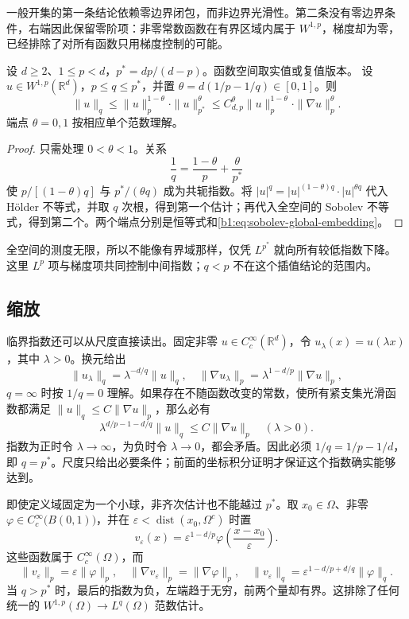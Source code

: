 一般开集的第一条结论依赖零边界闭包，而非边界光滑性。第二条没有零边界条件，右端因此保留零阶项：非零常数函数在有界区域内属于 \(W^{1,p}\)，梯度却为零，已经排除了对所有函数只用梯度控制的可能。

\begin{proposition}\label{b1:prop:sobolev-subcritical-interpolation}
设 \(d\geq2\)、\(1\leq p<d\)，\(p^*=dp/(d-p)\)。函数空间取实值或复值版本。
设 \(u\in W^{1,p}(\mathbb R^d)\)，\(p\leq q\leq p^*\)，并置
\(\theta=d(1/p-1/q)\in[0,1]\)。则
\begin{equation}\label{b1:eq:sobolev-subcritical-interpolation}
 \|u\|_q
 \leq \|u\|_p^{1-\theta}\cdot\|u\|_{p^*}^{\theta}
 \leq C_{d,p}^{\theta}
       \|u\|_p^{1-\theta}\cdot\|\nabla u\|_p^{\theta}.
\end{equation}
端点 \(\theta=0,1\) 按相应单个范数理解。
\end{proposition}
\begin{proof}
只需处理 \(0<\theta<1\)。关系
\[
 \frac1q=\frac{1-\theta}{p}+\frac{\theta}{p^*}
\]
使 \(p/[(1-\theta)q]\) 与 \(p^*/(\theta q)\) 成为共轭指数。将
\(|u|^q=|u|^{(1-\theta)q}\cdot|u|^{\theta q}\) 代入 Hölder 不等式，并取 \(q\) 次根，得到第一个估计；再代入全空间的 Sobolev 不等式，得到第二个。两个端点分别是恒等式和\eqref{b1:eq:sobolev-global-embedding}。
\end{proof}

全空间的测度无限，所以不能像有界域那样，仅凭 \(L^{p^*}\) 就向所有较低指数下降。这里 \(L^p\) 项与梯度项共同控制中间指数；\(q<p\) 不在这个插值结论的范围内。

\subsection{缩放}
\label{b1:subsec:240204}

临界指数还可以从尺度直接读出。固定非零
\(u\in C_c^\infty(\mathbb R^d)\)，令 \(u_\lambda(x)=u(\lambda x)\)，其中 \(\lambda>0\)。换元给出
\[
 \|u_\lambda\|_q=\lambda^{-d/q}\|u\|_q,\quad
 \|\nabla u_\lambda\|_p=\lambda^{1-d/p}\|\nabla u\|_p,
\]
\(q=\infty\) 时按 \(1/q=0\) 理解。如果存在不随函数改变的常数，使所有紧支集光滑函数都满足
\(\|u\|_q\leq C\|\nabla u\|_p\)，那么必有
\[
 \lambda^{d/p-1-d/q}\|u\|_q\leq C\|\nabla u\|_p
 \quad(\lambda>0).
\]
指数为正时令 \(\lambda\to\infty\)，为负时令 \(\lambda\to0\)，都会矛盾。因此必须
\(1/q=1/p-1/d\)，即 \(q=p^*\)。尺度只给出必要条件；前面的坐标积分证明才保证这个指数确实能够达到。

\ProseParagraphBreak

即使定义域固定为一个小球，非齐次估计也不能越过 \(p^*\)。取
\(x_0\in\Omega\)、非零 \(\varphi\in C_c^\infty\bigl(B(0,1)\bigr)\)，并在
\(\varepsilon<\operatorname{dist}(x_0,\Omega^c)\) 时置
\[
 v_\varepsilon(x)
 =\varepsilon^{1-d/p}
       \varphi\left(\frac{x-x_0}{\varepsilon}\right).
\]
这些函数属于 \(C_c^\infty(\Omega)\)，而
\[
 \|v_\varepsilon\|_p=\varepsilon\|\varphi\|_p,\quad
 \|\nabla v_\varepsilon\|_p=\|\nabla\varphi\|_p,\quad
 \|v_\varepsilon\|_q
 =\varepsilon^{1-d/p+d/q}\|\varphi\|_q.
\]
当 \(q>p^*\) 时，最后的指数为负，左端趋于无穷，前两个量却有界。这排除了任何统一的
\(W^{1,p}(\Omega)\rightarrow L^q(\Omega)\) 范数估计。

